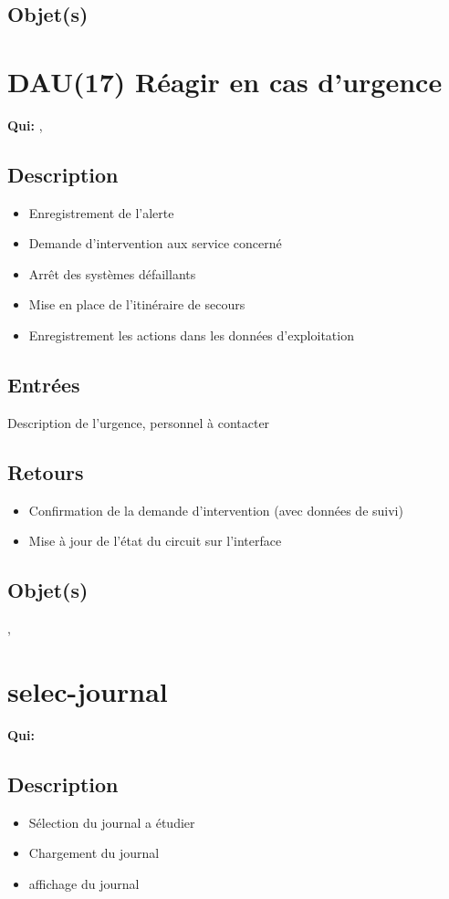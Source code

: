 	\subsection{Objet(s)}
		\allobjs

\section{DAU(17) Réagir en cas d'urgence}
	\textbf{Qui:} \urt, \us

	\subsection{Description}
	\begin{itemize}
		\item Enregistrement de l'alerte
		\item Demande d'intervention aux service concerné
		\item Arrêt des systèmes défaillants
		\item Mise en place de l'itinéraire de secours
		\item Enregistrement les actions dans les données d'exploitation
	\end{itemize}

	\subsection{Entrées}
		Description de l'urgence, personnel à contacter

	\subsection{Retours}
	\begin{itemize}
		\item Confirmation de la demande d'intervention (avec données de suivi)
		\item Mise à jour de l'état du circuit sur l'interface
	\end{itemize}

	\subsection{Objet(s)}
		\event, \syslog

\section{selec-journal}
	\textbf{Qui:} \urt

	\subsection{Description}
	\begin{itemize}
		\item Sélection du journal a étudier
		\item Chargement du journal
		\item affichage du journal
	\end{itemize}

